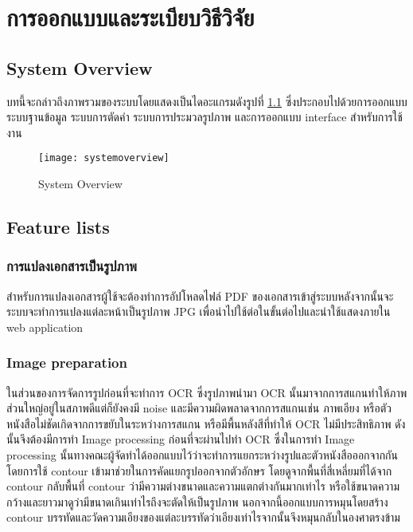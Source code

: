 \chapter{การออกแบบและระเบียบวิธีวิจัย}

\section{System Overview}

บทนี้จะกล่าวถึงภาพรวมของระบบโดยแสดงเป็นไดอะแกรมดังรูปที่ \ref{fig:systemoverview} ซึ่งประกอบไปด้วยการออกแบบระบบฐานข้อมูล ระบบการตัดคำ ระบบการประมวลรูปภาพ และการออกแบบ interface สำหรับการใช้งาน

\begin{figure}[H]
    \centering
    \texttt{[image: systemoverview]}
    \caption{System Overview}\label{fig:systemoverview}
\end{figure}

\section{Feature lists}
\subsection{การแปลงเอกสารเป็นรูปภาพ}

สำหรับการแปลงเอกสารผู้ใช้จะต้องทำการอัปโหลดไฟล์ PDF ของเอกสารเข้าสู่ระบบหลังจากนั้นจะระบบจะทำการแปลงแต่ละหน้าเป็นรูปภาพ JPG เพื่อนำไปใช้ต่อในขั้นต่อไปและนำใช้แสดงภายใน web application

\subsection{Image preparation}

ในส่วนของการจัดการรูปก่อนที่จะทำการ OCR ซึ่งรูปภาพนำมา OCR นั้นมาจากการสแกนทำให้ภาพส่วนใหญ่อยู่ในสภาพดีแต่ก็ยังคงมี noise  และมีความผิดพลาดจากการสแกนเช่น ภาพเอียง หรือตัวหนังสือไม่ชัดเกิดจากการขยับในระหว่างการสแกน หรือมีพื้นหลังสีที่ทำให้ OCR ไม่มีประสิทธิภาพ ดังนั้นจึงต้องมีการทำ Image processing ก่อนที่จะผ่านไปทำ OCR
ซึ่งในการทำ Image processing นั้นทางคณะผู้จัดทำได้ออกแบบไว้ว่าจะทำการแยกระหว่างรูปและตัวหนังสือออกจากกัน โดยการใช้ contour เข้ามาช่วยในการคัดแยกรูปออกจากตัวอักษร โดยดูจากพื้นที่สี่เหลี่ยมที่ได้จาก contour กลับพื้นที่ contour ว่ามีความต่างขนาดและความแตกต่างกันมากเท่าไร หรือใช้ขนาดความกว้างและยาวมาดูว่ามีขนาดเกินเท่าไรถึงจะตัดให้เป็นรูปภาพ
นอกจากนี้ออกแบบการหมุนโดยสร้าง contour บรรทัดและวัดความเอียงของแต่ละบรรทัดว่าเอียงเท่าไรจากนั้นจึงหมุนกลับในองศาตรงข้าม


